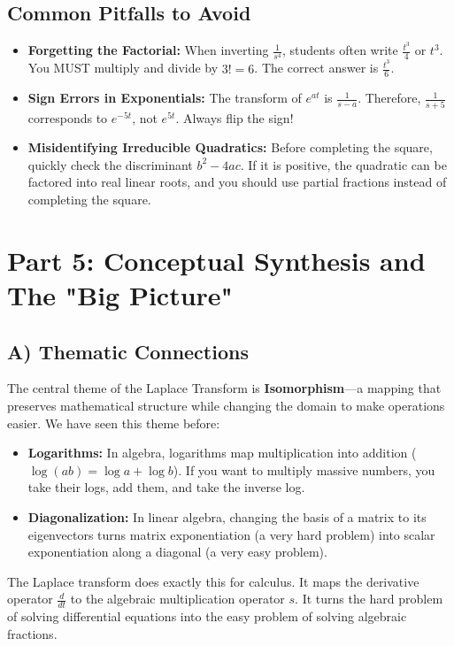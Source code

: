 \documentclass[11pt, a4paper]{article}
\theoremstyle{definition}
\theoremstyle{remark}
\begin{document}
\subsection{Common Pitfalls to Avoid}
\begin{itemize}
    \item \textbf{Forgetting the Factorial:} When inverting $\frac{1}{s^4}$, students often write $\frac{t^3}{4}$ or $t^3$. You MUST multiply and divide by $3! = 6$. The correct answer is $\frac{t^3}{6}$.
    \item \textbf{Sign Errors in Exponentials:} The transform of $e^{at}$ is $\frac{1}{s-a}$. Therefore, $\frac{1}{s+5}$ corresponds to $e^{-5t}$, not $e^{5t}$. Always flip the sign!
    \item \textbf{Misidentifying Irreducible Quadratics:} Before completing the square, quickly check the discriminant $b^2 - 4ac$. If it is positive, the quadratic can be factored into real linear roots, and you should use partial fractions instead of completing the square.
\end{itemize}

\newpage
\section{Part 5: Conceptual Synthesis and The "Big Picture"}

\subsection{A) Thematic Connections}
The central theme of the Laplace Transform is \textbf{Isomorphism}—a mapping that preserves mathematical structure while changing the domain to make operations easier. We have seen this theme before:
\begin{itemize}
    \item \textbf{Logarithms:} In algebra, logarithms map multiplication into addition ($\log(ab) = \log a + \log b$). If you want to multiply massive numbers, you take their logs, add them, and take the inverse log.
    \item \textbf{Diagonalization:} In linear algebra, changing the basis of a matrix to its eigenvectors turns matrix exponentiation (a very hard problem) into scalar exponentiation along a diagonal (a very easy problem).
\end{itemize}
The Laplace transform does exactly this for calculus. It maps the derivative operator $\frac{d}{dt}$ to the algebraic multiplication operator $s$. It turns the hard problem of solving differential equations into the easy problem of solving algebraic fractions.
\end{document}
